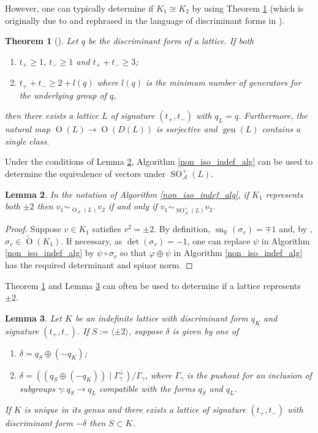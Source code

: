 \documentclass[12pt, a4paper]{article}
\newtheorem{theorem}{Theorem}[section]
\newtheorem{lemma}[theorem]{Lemma}
\newcommand{\RR}{\mathbb{R}}
\newcommand{\la}{\langle}
\newcommand{\ra}{\rangle}
\newcommand{\Ac}{\mathcal{A}}
\newcommand{\opn}{\operatorname}
\newcommand{\op}{\oplus}
\begin{document}
However, one can typically determine if $K_1 \cong K_2$ by using Theorem \ref{singclassthm} (which is originally due to \cite{KneserIndef} and rephrased in the language of discriminant forms in \cite{Nikulin}).
\begin{theorem}[{\hspace{1sp}\cite{KneserIndef}\cite[Theorem 1.13.2/1.14.2]{Nikulin}}]\label{singclassthm}
  Let $q$ be the discriminant form of a lattice.
  If both
\begin{enumerate}
\item $t_+ \geq 1$, $t_- \geq 1$ and $t_+ + t_- \geq 3$;
\item  $t_+ + t_- \geq 2 + l(q)$ where $l(q)$ is the minimum number of generators for the underlying group of $q$, 
\end{enumerate}
then there exists a lattice $L$ of signature $(t_+, t_-)$ with $q_L = q$. Furthermore, the natural map $\opn{O}(L) \rightarrow \opn{O}(D(L))$ is surjective and $\opn{gen}(L)$ contains a single class.
\end{theorem}
Under the conditions of Lemma \ref{2reflem}, Algorithm \ref{non_iso_indef_alg} can be used to determine the equivalence of vectors under $\opn{SO}_{\Ac}^+(L)$.
\begin{lemma}\label{2reflem}
  In the notation of Algorithm \ref{non_iso_indef_alg}, if $K_1$ represents both $\pm 2$ then $v_1 \sim_{\opn{O}_{\Ac}(L)} v_2$ if and only if $v_1 \sim_{\opn{SO}_{\Ac}^+(L)} v_2$. 
\end{lemma}
\begin{proof}
  Suppose $v \in K_1$ satisfies $v^2 = \pm 2$.
  By definition, $\opn{sn}_{\RR}(\sigma_v) = \mp 1$ and, by \cite[Proposition 3.1]{GHSK3},  $\sigma_v \in \widetilde{\opn{O}}(K_1)$.
  If necessary, as $\opn{det}(\sigma_v) = -1$, one can replace $\psi$ in Algorithm \ref{non_iso_indef_alg} by $\psi \circ \sigma_v$ so that $\varphi \op \psi$ in Algorithm \ref{non_iso_indef_alg} has the required determinant and spinor norm. 
\end{proof}
Theorem \ref{singclassthm} and Lemma \ref{indefrep2} can often be used to determine if a lattice represents $\pm 2$.
\begin{lemma}\label{indefrep2}
  Let $K$ be an indefinite lattice with discriminant form $q_K$ and signature $(t_+, t_-)$.
  If $S := \la \pm 2 \ra$, suppose $\delta$ is given by one of
\begin{enumerate}
\item $\delta= q_S \op (-q_K)$; 
\item $\delta=( (q_S \op (-q_K)) \mid \Gamma_{\gamma}^{\perp}) /\Gamma_{\gamma}$, where $\Gamma_{\gamma}$ is the pushout for an inclusion of subgroups $\gamma:q_S \rightarrow q_L$ compatible with the forms $q_S$ and $q_L$.
\end{enumerate}
If $K$ is unique in its genus and there exists a lattice of signature $(t_+, t_-)$ with discriminant form $-\delta$ then $S \subset K$.
\end{lemma}
\end{document}
